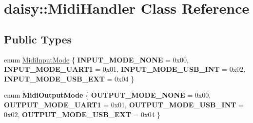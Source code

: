 \hypertarget{classdaisy_1_1_midi_handler}{}\section{daisy\+:\+:Midi\+Handler Class Reference}
\label{classdaisy_1_1_midi_handler}
\subsection*{Public Types}
\begin{DoxyCompactItemize}
\item 
enum \hyperlink{classdaisy_1_1_midi_handler_acc2df91e9c18571da6edecaec4fbc7fe}{Midi\+Input\+Mode} \{ {\bfseries I\+N\+P\+U\+T\+\_\+\+M\+O\+D\+E\+\_\+\+N\+O\+NE} = 0x00, 
{\bfseries I\+N\+P\+U\+T\+\_\+\+M\+O\+D\+E\+\_\+\+U\+A\+R\+T1} = 0x01, 
{\bfseries I\+N\+P\+U\+T\+\_\+\+M\+O\+D\+E\+\_\+\+U\+S\+B\+\_\+\+I\+NT} = 0x02, 
{\bfseries I\+N\+P\+U\+T\+\_\+\+M\+O\+D\+E\+\_\+\+U\+S\+B\+\_\+\+E\+XT} = 0x04
 \}
\item 
\mbox{\label{classdaisy_1_1_midi_handler_a2bb8e841f287ba5fecfa2cead766a40c}} 
enum {\bfseries Midi\+Output\+Mode} \{ {\bfseries O\+U\+T\+P\+U\+T\+\_\+\+M\+O\+D\+E\+\_\+\+N\+O\+NE} = 0x00, 
{\bfseries O\+U\+T\+P\+U\+T\+\_\+\+M\+O\+D\+E\+\_\+\+U\+A\+R\+T1} = 0x01, 
{\bfseries O\+U\+T\+P\+U\+T\+\_\+\+M\+O\+D\+E\+\_\+\+U\+S\+B\+\_\+\+I\+NT} = 0x02, 
{\bfseries O\+U\+T\+P\+U\+T\+\_\+\+M\+O\+D\+E\+\_\+\+U\+S\+B\+\_\+\+E\+XT} = 0x04
 \}
\end{DoxyCompactItemize}
